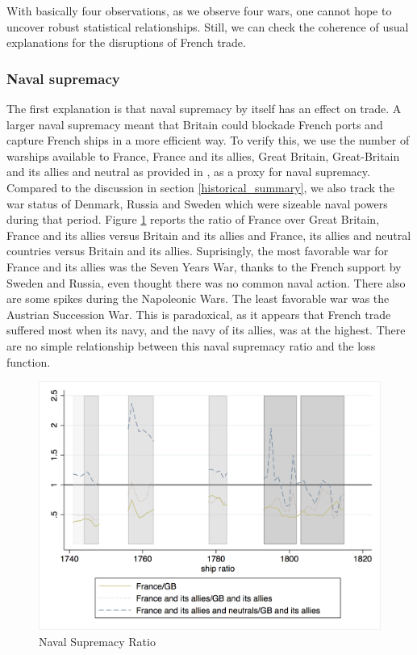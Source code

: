 \documentclass[12pt,a4paper,notitlepage,english]{article}
\begin{document}
With basically four observations, as we observe four wars, one cannot hope to uncover robust statistical relationships. Still, we can check the coherence of usual explanations for the disruptions of French trade.
\subsubsection{Naval supremacy}
The first explanation is that naval supremacy by itself has an effect on trade.
A larger naval supremacy meant that Britain could blockade French ports and capture French ships in a more efficient way.
To verify this, we use the number of warships available to France, France and its allies, Great Britain, Great-Britain and its allies and neutral as provided in \cite{modelski1988seapower}, as a proxy for naval supremacy.
Compared to the discussion in section \ref{historical_summary}, we also track the war status of Denmark, Russia and Sweden which were sizeable naval powers during that period.
Figure \ref{naval_supremacy_ratios} reports the ratio of France over Great Britain, France and its allies versus Britain and its allies and France, its allies and neutral countries versus Britain and its allies.
Suprisingly, the most favorable war for France and its allies was the Seven Years War, thanks to the French support by Sweden and Russia, even thought there was no common naval action.
There also are some spikes during the Napoleonic Wars.
The least favorable war was the Austrian Succession War. 
This is paradoxical, as it appears that French trade suffered most when its navy, and the navy of its allies, was at the highest.
There are no simple relationship between this naval supremacy ratio and the loss function. 
\begin{center}
\begin{figure}[H]
\caption{Naval Supremacy Ratio}
\label{naval_supremacy_ratios}
\centering
\includegraphics[scale=.51]{naval_supremacy_ratios.png}
\end{figure}
\end{center}
\end{document}
